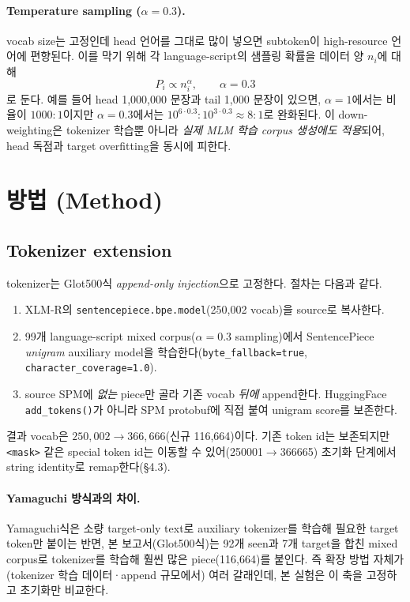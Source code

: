 \documentclass[11pt,a4paper]{article}
\begin{document}
\paragraph{Temperature sampling ($\alpha=0.3$).} vocab size는 고정인데 head 언어를 그대로 많이 넣으면 subtoken이 high-resource 언어에 편향된다. 이를 막기 위해 각 language-script의 샘플링 확률을 데이터 양 $n_i$에 대해
\[
P_i \propto n_i^{\alpha},\qquad \alpha=0.3
\]
로 둔다. 예를 들어 head 1{,}000{,}000 문장과 tail 1{,}000 문장이 있으면, $\alpha=1$에서는 비율이 $1000{:}1$이지만 $\alpha=0.3$에서는 $10^{6\cdot0.3}{:}10^{3\cdot0.3}\approx 8{:}1$로 완화된다. 이 down-weighting은 tokenizer 학습뿐 아니라 \emph{실제 MLM 학습 corpus 생성에도 적용}되어, head 독점과 target overfitting을 동시에 피한다.

\section{방법 (Method)}

\subsection{Tokenizer extension}
tokenizer는 Glot500식 \emph{append-only injection}으로 고정한다. 절차는 다음과 같다.
\begin{enumerate}\setlength\itemsep{0.1em}
\item XLM-R의 \texttt{sentencepiece.bpe.model}(250{,}002 vocab)을 source로 복사한다.
\item 99개 language-script mixed corpus($\alpha=0.3$ sampling)에서 SentencePiece \emph{unigram} auxiliary model을 학습한다(\texttt{byte\_fallback=true}, \texttt{character\_coverage=1.0}).
\item source SPM에 \emph{없는} piece만 골라 기존 vocab \emph{뒤에} append한다. HuggingFace \texttt{add\_tokens()}가 아니라 SPM protobuf에 직접 붙여 unigram score를 보존한다.
\end{enumerate}
결과 vocab은 $250{,}002 \to 366{,}666$(신규 116{,}664)이다. 기존 token id는 보존되지만 \verb|<mask>| 같은 special token id는 이동할 수 있어(250001$\to$366665) 초기화 단계에서 string identity로 remap한다(\S4.3).

\paragraph{Yamaguchi 방식과의 차이.} Yamaguchi식은 소량 target-only text로 auxiliary tokenizer를 학습해 필요한 target token만 붙이는 반면, 본 보고서(Glot500식)는 92개 seen과 7개 target을 합친 mixed corpus로 tokenizer를 학습해 훨씬 많은 piece(116{,}664)를 붙인다. 즉 확장 방법 자체가 (tokenizer 학습 데이터·append 규모에서) 여러 갈래인데, 본 실험은 이 축을 고정하고 초기화만 비교한다.
\end{document}

